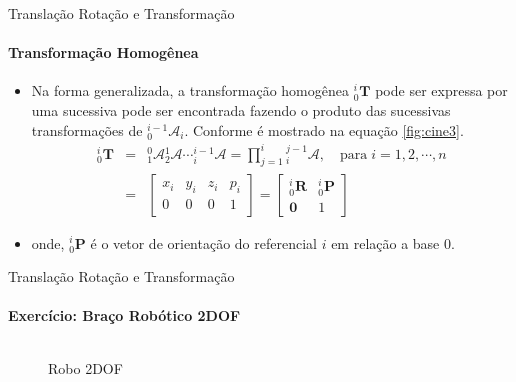 \documentclass{beamer}
\begin{document}
\begin{frame}{Translação Rotação e Transformação}
    \framesubtitle{Transformação Homogênea}
    \begin{itemize}
        \item Na forma generalizada, a transformação homogênea ${}^{i}_0\mathbf{T}$ pode ser expressa por uma sucessiva pode ser encontrada fazendo o produto das sucessivas transformações de ${}^{i-1}_0\mathcal{A}_i$. Conforme é mostrado na equação \eqref{fig:cine3}.
        \begin{equation}\label{fig:cine3}
        \begin{array}{lcl}
        {}^i_0\mathbf{T} &= & {}^0_1\mathcal{A}{}^1_2\mathcal{A} \cdots {}^{i-1}_i\mathcal{A} = \prod \limits^i_{j=1}{}^{j-1}_i\mathcal{A}, \quad \mathrm{para\;}i=1,2,\cdots,n\\[.2cm]
        & = &
        \begin{bmatrix}
        x_i & y_i & z_i & p_i\\
        0 & 0 & 0 & 1
        \end{bmatrix} = 
        \begin{bmatrix}
        {}^i_0\mathbf{R} & {}^i_0\mathbf{P}\\
        \mathbf{0} & 1
        \end{bmatrix}
        \end{array}
        \end{equation}      
        \item onde, ${}^i_0\mathbf{P}$ é o vetor de orientação do referencial $i$ em relação a base $0$.
    \end{itemize}

\end{frame}

\begin{frame}{Translação Rotação e Transformação}
\framesubtitle{Exercício: Braço Robótico 2DOF}

    \begin{columns}
        \begin{column}[c]{0.5\textwidth}
            \begin{figure}[!ht]
                
                \caption{Robo 2DOF}
            \end{figure}
        \end{column}
        \begin{column}[c]{0.5\textwidth}
            

        \end{column}
    \end{columns}

\end{frame}
\end{document}
